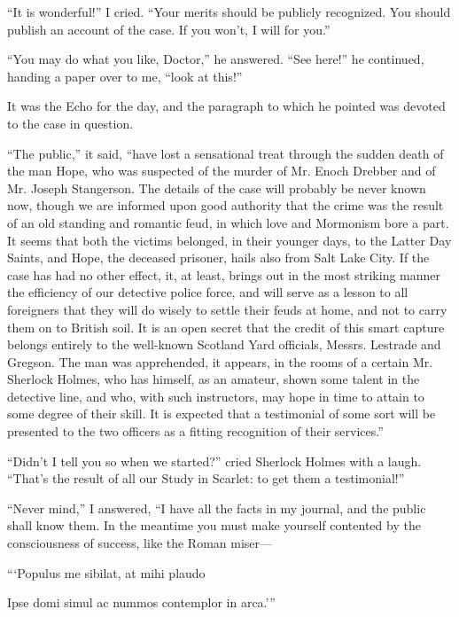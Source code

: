 \documentclass[12pt]{book}
\begin{document}
“It is wonderful!” I cried. “Your merits should be publicly recognized. You should publish an account of the case. If you won’t, I will for you.” 

“You may do what you like, Doctor,” he answered. “See here!” he continued, handing a paper over to me, “look at this!” 

It was the Echo for the day, and the paragraph to which he pointed was devoted to the case in question. 

“The public,” it said, “have lost a sensational treat through the sudden death of the man Hope, who was suspected of the murder of Mr. Enoch Drebber and of Mr. Joseph Stangerson. The details of the case will probably be never known now, though we are informed upon good authority that the crime was the result of an old standing and romantic feud, in which love and Mormonism bore a part. It seems that both the victims belonged, in their younger days, to the Latter Day Saints, and Hope, the deceased prisoner, hails also from Salt Lake City. If the case has had no other effect, it, at least, brings out in the most striking manner the efficiency of our detective police force, and will serve as a lesson to all foreigners that they will do wisely to settle their feuds at home, and not to carry them on to British soil. It is an open secret that the credit of this smart capture belongs entirely to the well-known Scotland Yard officials, Messrs. Lestrade and Gregson. The man was apprehended, it appears, in the rooms of a certain Mr. Sherlock Holmes, who has himself, as an amateur, shown some talent in the detective line, and who, with such instructors, may hope in time to attain to some degree of their skill. It is expected that a testimonial of some sort will be presented to the two officers as a fitting recognition of their services.” 

“Didn’t I tell you so when we started?” cried Sherlock Holmes with a laugh. “That’s the result of all our Study in Scarlet: to get them a testimonial!” 

“Never mind,” I answered, “I have all the facts in my journal, and the public shall know them. In the meantime you must make yourself contented by the consciousness of success, like the Roman miser— 

            “‘Populus me sibilat, at mihi plaudo

       Ipse domi simul ac nummos contemplor in arca.’”
\end{document}
